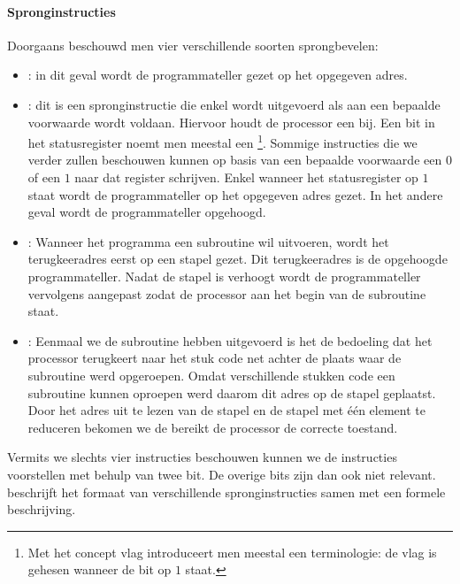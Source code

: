 \paragraph{Spronginstructies}
Doorgaans beschouwd men vier verschillende soorten sprongbevelen:
\begin{itemize}
 \item {}: in dit geval wordt de programmateller gezet op het opgegeven adres.
 \item {}: dit is een spronginstructie die enkel wordt uitgevoerd als aan een bepaalde voorwaarde wordt voldaan. Hiervoor houdt de processor een  bij. Een bit in het statusregister noemt men meestal een \footnote{Met het concept vlag introduceert men meestal een terminologie: de vlag is gehesen wanneer de bit op $1$ staat.}. Sommige instructies die we verder zullen beschouwen kunnen op basis van een bepaalde voorwaarde een $0$ of een $1$ naar dat register schrijven. Enkel wanneer het statusregister op $1$ staat wordt de programmateller op het opgegeven adres gezet. In het andere geval wordt de programmateller opgehoogd.
 \item {}: Wanneer het programma een subroutine wil uitvoeren, wordt het terugkeeradres eerst op een stapel gezet. Dit terugkeeradres is de opgehoogde programmateller. Nadat de stapel is verhoogt wordt de programmateller vervolgens aangepast zodat de processor aan het begin van de subroutine staat.
 \item {}: Eenmaal we de subroutine hebben uitgevoerd is het de bedoeling dat het processor terugkeert naar het stuk code net achter de plaats waar de subroutine werd opgeroepen. Omdat verschillende stukken code een subroutine kunnen oproepen werd daarom dit adres op de stapel geplaatst. Door het adres uit te lezen van de stapel en de stapel met \'e\'en element te reduceren bekomen we de bereikt de processor de correcte toestand.
\end{itemize}
Vermits we slechts vier instructies beschouwen kunnen we de instructies voorstellen met behulp van twee bit. De overige bits zijn dan ook niet relevant.  beschrijft het formaat van verschillende spronginstructies samen met een formele beschrijving.
